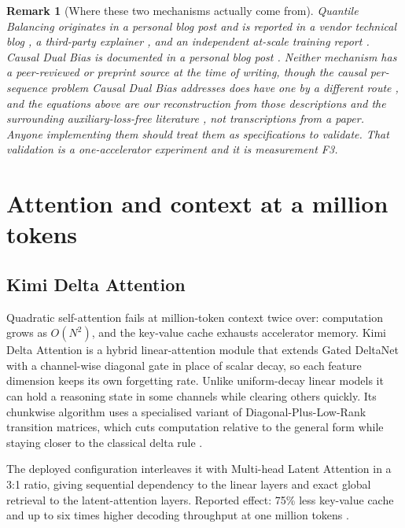 \documentclass[11pt]{article}
\newtheorem{remark}{Remark}
\begin{document}
\begin{remark}[Where these two mechanisms actually come from]
\label{rem:qbsource}
Quantile Balancing originates in a personal blog post \cite{su2026qb} and is reported in a vendor technical blog \cite{moonshot2026k3}, a third-party explainer \cite{huang2026k3}, and an independent at-scale training report \cite{openathena2026qb}. Causal Dual Bias is documented in a personal blog post \cite{chang2026cdb}. Neither mechanism has a peer-reviewed or preprint source at the time of writing, though the causal per-sequence problem Causal Dual Bias addresses does have one by a different route \cite{sun2026et}, and the equations above are our reconstruction from those descriptions and the surrounding auxiliary-loss-free literature \cite{wang2024lossfree,alflb2025}, not transcriptions from a paper. Anyone implementing them should treat them as specifications to validate. That validation is a one-accelerator experiment and it is measurement F3.
\end{remark}

\section{Attention and context at a million tokens}
\label{sec:attention}

\subsection{Kimi Delta Attention}

Quadratic self-attention fails at million-token context twice over: computation grows as $O(N^2)$, and the key-value cache exhausts accelerator memory. Kimi Delta Attention \cite{team2025kimilinear} is a hybrid linear-attention module that extends Gated DeltaNet with a channel-wise diagonal gate in place of scalar decay, so each feature dimension keeps its own forgetting rate. Unlike uniform-decay linear models it can hold a reasoning state in some channels while clearing others quickly. Its chunkwise algorithm uses a specialised variant of Diagonal-Plus-Low-Rank transition matrices, which cuts computation relative to the general form while staying closer to the classical delta rule \cite{team2025kimilinear}.

The deployed configuration interleaves it with Multi-head Latent Attention in a 3:1 ratio, giving sequential dependency to the linear layers and exact global retrieval to the latent-attention layers. Reported effect: 75\% less key-value cache and up to six times higher decoding throughput at one million tokens \cite{team2025kimilinear}.
\end{document}
